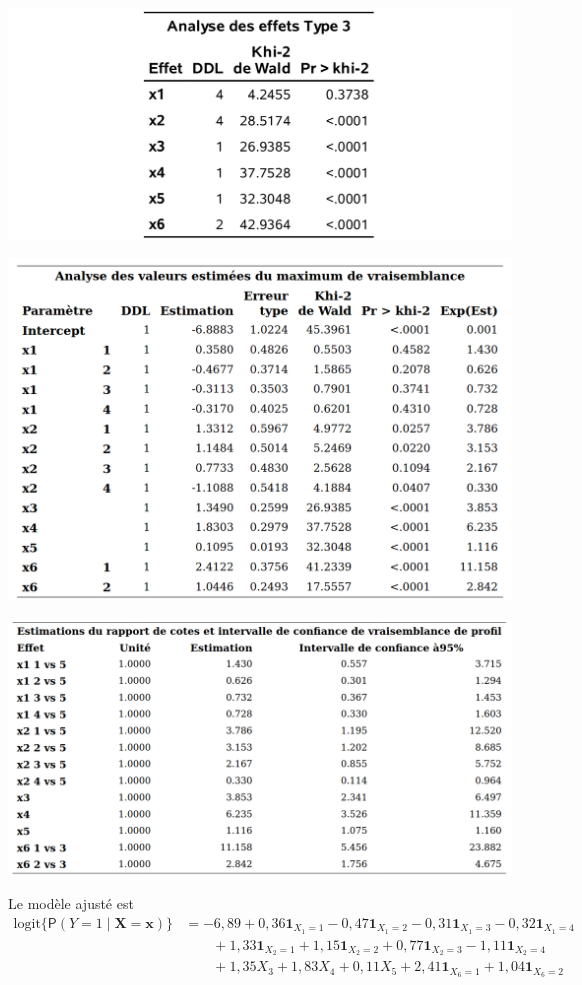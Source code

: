 \documentclass[
  11pt,
  letterpaper,
]{book}
\theoremstyle{definition}
\theoremstyle{definition}
\theoremstyle{definition}
\theoremstyle{remark}
\begin{document}
\begin{center}\includegraphics[width=0.75\linewidth]{figures/03-logistic-e6} \end{center}

\begin{center}\includegraphics[width=0.9\linewidth]{figures/03-logistic-e7} \end{center}

\begin{center}\includegraphics[width=1\linewidth]{figures/03-logistic-e8} \end{center}

Le modèle ajusté est
\begin{align*}
 \mathrm{logit}\{{\mathsf P}\left(Y=1 \mid \boldsymbol{X}=\boldsymbol{x}\right)\} &= -6,89 + 0,36{\mathbf 1}_{X_1=1} - 0,47{\mathbf 1}_{X_1=2} - 0,31{\mathbf 1}_{X_1=3} - 0,32{\mathbf 1}_{X_1=4} \\& \qquad 
+ 1,33{\mathbf 1}_{X_2=1} + 1,15{\mathbf 1}_{X_2=2} + 0,77{\mathbf 1}_{X_2=3} - 1,11{\mathbf 1}_{X_2=4} \\&\qquad 
+ 1,35X_3+ 1,83X_4
+ 0,11X_5
+ 2,41{\mathbf 1}_{X_6=1} + 1,04{\mathbf 1}_{X_6=2}
\end{align*}
\end{document}
